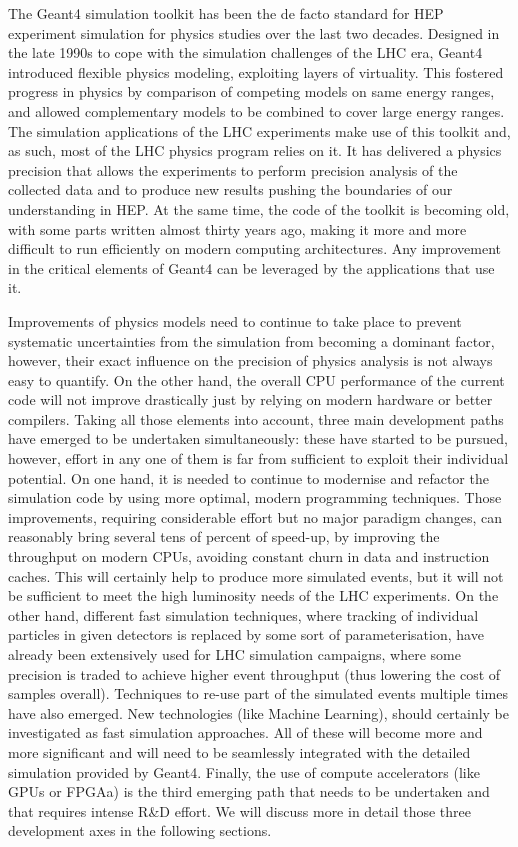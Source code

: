 \documentclass[10pt,a4paper]{article}
\begin{document}
The Geant4 simulation toolkit has been the de facto standard for HEP
experiment simulation for physics studies over the last two decades.
Designed in the late 1990s to cope with the simulation challenges of the
LHC era, Geant4 introduced flexible physics modeling, exploiting layers
of virtuality. This fostered progress in physics by comparison of
competing models on same energy ranges, and allowed complementary models
to be combined to cover large energy ranges. The simulation applications
of the LHC experiments make use of this toolkit and, as such, most of
the LHC physics program relies on it. It has delivered a physics
precision that allows the experiments to perform precision analysis of
the collected data and to produce new results pushing the boundaries of
our understanding in HEP. At the same time, the code of the toolkit is
becoming old, with some parts written almost thirty years ago, making it
more and more difficult to run efficiently on modern computing
architectures. Any improvement in the critical elements of Geant4 can be
leveraged by the applications that use it.

Improvements of physics models need to continue to take place to prevent
systematic uncertainties from the simulation from becoming a dominant
factor, however, their exact influence on the precision of physics
analysis is not always easy to quantify. On the other hand, the overall
CPU performance of the current code will not improve drastically just by
relying on modern hardware or better compilers. Taking all those
elements into account, three main development paths have emerged to be
undertaken simultaneously: these have started to be pursued, however,
effort in any one of them is far from sufficient to exploit their
individual potential. On one hand, it is needed to continue to modernise
and refactor the simulation code by using more optimal, modern
programming techniques. Those improvements, requiring considerable
effort but no major paradigm changes, can reasonably bring several tens
of percent of speed-up, by improving the throughput on modern CPUs,
avoiding constant churn in data and instruction caches. This will
certainly help to produce more simulated events, but it will not be
sufficient to meet the high luminosity needs of the LHC experiments. On
the other hand, different fast simulation techniques, where tracking of
individual particles in given detectors is replaced by some sort of
parameterisation, have already been extensively used for LHC simulation
campaigns, where some precision is traded to achieve higher event
throughput (thus lowering the cost of samples overall). Techniques to
re-use part of the simulated events multiple times have also emerged.
New technologies (like Machine Learning), should certainly be
investigated as fast simulation approaches. All of these will become
more and more significant and will need to be seamlessly integrated with
the detailed simulation provided by Geant4. Finally, the use of compute
accelerators (like GPUs or FPGAa) is the third emerging path that needs
to be undertaken and that requires intense R\&D effort. We will discuss
more in detail those three development axes in the following sections.
\end{document}
